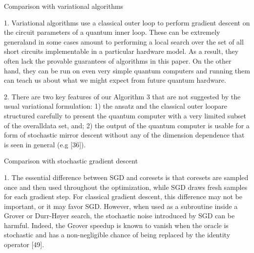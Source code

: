 \documentclass[
  ignorenonframetext,
]{beamer}
\begin{document}
\begin{frame}{Comparison with variational algorithms}
\protect\hypertarget{comparison-with-variational-algorithms}{}
\begin{small}

1. Variational algorithms use a classical outer loop to perform gradient descent on the circuit parameters of a quantum inner loop.  These can be extremely generaland in some cases amount to performing a local search over the set of all short circuits implementable in a particular hardware model.  As a result, they often lack the provable guarantees of algorithms in this paper.  On the other hand, they can be run on even very simple quantum computers and running them can teach us about what we might expect from future quantum hardware.

2. There are two key features of our Algorithm 3 that are not suggested by the usual variational formulation:  1) the ansatz and the classical outer loopare structured carefully to present the quantum computer with a very limited subset of the overalldata set,  and;  2) the output of the quantum computer is usable for a form of stochastic mirror descent without any of the dimension dependence that is seen in general (e.g [36]).

\end{small}
\end{frame}

\begin{frame}{Comparison with stochastic gradient descent}
\protect\hypertarget{comparison-with-stochastic-gradient-descent}{}
\begin{small}

1. The essential difference between SGD and coresets is that coresets are sampled once and then used  throughout  the  optimization,  while  SGD  draws  fresh  samples  for  each  gradient  step.   For classical gradient descent,  this difference may not be important,  or it may favor SGD. However, when used as a subroutine inside a Grover or Durr-Høyer search, the stochastic noise introduced by SGD can be harmful.  Indeed, the Grover speedup is known to vanish when the oracle is stochastic and has a non-negligible chance of being replaced by the identity operator [49].

\end{small}
\end{frame}
\end{document}

